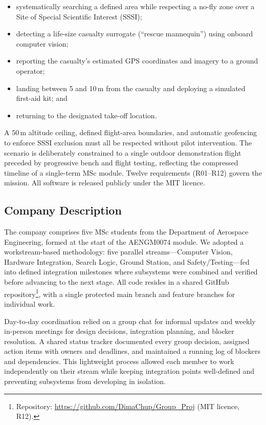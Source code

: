 \begin{itemize}
    \item systematically searching a defined area while respecting a no-fly zone over a Site of Special Scientific Interest (SSSI);
    \item detecting a life-size casualty surrogate (``rescue mannequin'') using onboard computer vision;
    \item reporting the casualty's estimated GPS coordinates and imagery to a ground operator;
    \item landing between 5 and 10\,m from the casualty and deploying a simulated first-aid kit; and
    \item returning to the designated take-off location.
\end{itemize}

A 50\,m altitude ceiling, defined flight-area boundaries, and automatic geofencing to enforce SSSI exclusion must all be respected without pilot intervention. The scenario is deliberately constrained to a single outdoor demonstration flight preceded by progressive bench and flight testing, reflecting the compressed timeline of a single-term MSc module. Twelve requirements (R01--R12) govern the mission. All software is released publicly under the MIT licence.

\subsection*{Company Description}

The company comprises five MSc students from the Department of Aerospace Engineering, formed at the start of the AENGM0074 module. We adopted a workstream-based methodology: five parallel streams---Computer Vision, Hardware Integration, Search Logic, Ground Station, and Safety/Testing---fed into defined integration milestones where subsystems were combined and verified before advancing to the next stage. All code resides in a shared GitHub repository\footnote{Repository: \url{https://github.com/DimaChup/Group_Proj} (MIT licence, R12).}, with a single protected main branch and feature branches for individual work.

Day-to-day coordination relied on a group chat for informal updates and weekly in-person meetings for design decisions, integration planning, and blocker resolution. A shared status tracker documented every group decision, assigned action items with owners and deadlines, and maintained a running log of blockers and dependencies. This lightweight process allowed each member to work independently on their stream while keeping integration points well-defined and preventing subsystems from developing in isolation.

